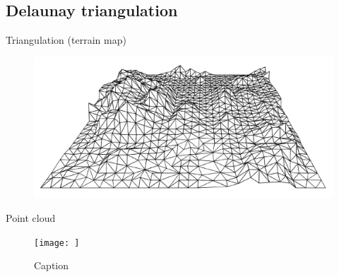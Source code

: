 \subsection{Delaunay triangulation}
\begin{frame}{Triangulation (terrain map)}
\begin{figure}
    \centering
    \includegraphics[width=\textwidth]{figs/L07-terrain-map.png}
\end{figure}

\end{frame}


\begin{frame}{Point cloud}
\begin{figure}
    \centering
    \texttt{[image: ]}
    \caption{Caption}
    \label{fig:my_label}
\end{figure}
    
\end{frame}

